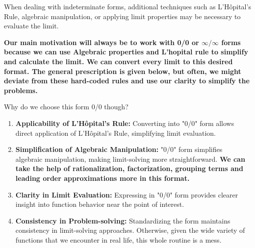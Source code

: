 When dealing with indeterminate forms, additional techniques such as L'Hôpital's Rule, algebraic manipulation, or applying limit properties may be necessary to evaluate the limit. 

\textbf{Our main motivation will always be to work with 0/0 or $\infty/\infty$ forms because we can use Algebraic properties and L'hopital rule to simplify and calculate the limit. We can convert every limit to this desired format. The general prescription is given below, but often, we might deviate from these hard-coded rules and use our clarity to simplify the problems.}

Why do we choose this form 0/0 though?

\begin{enumerate}
    \item \textbf{Applicability of L'Hôpital's Rule:} Converting into "0/0" form allows direct application of L'Hôpital's Rule, simplifying limit evaluation.
    
    \item \textbf{Simplification of Algebraic Manipulation:} "0/0" form simplifies algebraic manipulation, making limit-solving more straightforward. \textbf{We can take the help of rationalization, factorization, grouping terms and leading order approximations more in this format.}
    
    \item \textbf{Clarity in Limit Evaluation:} Expressing in "0/0" form provides clearer insight into function behavior near the point of interest.
    
    \item \textbf{Consistency in Problem-solving:} Standardizing the form maintains consistency in limit-solving approaches. Otherwise, given the wide variety of functions that we encounter in real life, this whole routine is a mess. 
\end{enumerate}

